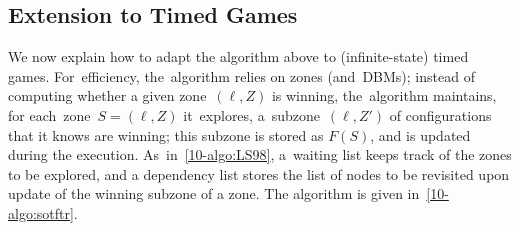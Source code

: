 \subsection*{Extension to Timed Games}

We now explain how to adapt the algorithm above to (infinite-state)
timed games. 
%
For~efficiency, the~algorithm relies on zones (and~DBMs); instead of
computing whether a given zone~$(\ell,Z)$ is winning, the~algorithm
maintains, for each~zone~$S=(\ell,Z)$ it~explores, a~subzone~$(\ell,Z')$ of
configurations that it knows are winning; this subzone is stored as
$F(S)$, and is updated during the execution.
As~in~\cref{10-algo:LS98}, a~waiting list keeps track of the
zones to be explored, and a dependency list stores the list of nodes
to be revisited upon update of the winning subzone of a zone.
The algorithm is given in~\cref{10-algo:sotftr}.



